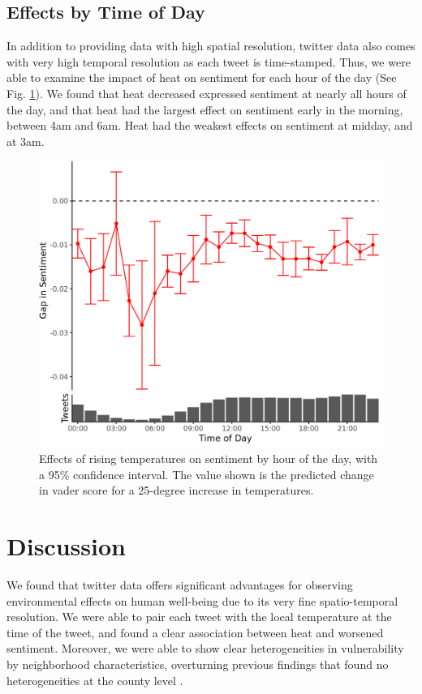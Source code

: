 \documentclass{article}
\begin{document}
\subsection{Effects by Time of Day}

In addition to providing data with high spatial resolution, twitter data also comes with very high temporal resolution as each tweet is time-stamped.  Thus, we were able to examine the impact of heat on sentiment for each hour of the day (See Fig. \ref{fig:ts-wbgt}).  We found that heat decreased expressed sentiment at nearly all hours of the day, and that heat had the largest effect on sentiment early in the morning, between 4am and 6am.  Heat had the weakest effects on sentiment at midday, and at 3am.

\begin{figure}[H]
  \centering
  \includegraphics[width=0.5\linewidth]{../res/ts.png}
  \caption{Effects of rising temperatures on sentiment by hour of the day, with a 95\% confidence interval.  The value shown is the predicted change in vader score for a 25-degree increase in temperatures.}
  \label{fig:ts-wbgt}
\end{figure}

\section{Discussion}
We found that twitter data offers significant advantages for observing environmental effects on human well-being due to its very fine spatio-temporal resolution.  We were able to pair each tweet with the local temperature at the time of the tweet, and found a clear association between heat and worsened sentiment.   Moreover, we were able to show clear heterogeneities in vulnerability by neighborhood characteristics, overturning previous findings that found no heterogeneities at the county level \cite{Burke2018Aug, Mullins2019Dec}.
\end{document}
